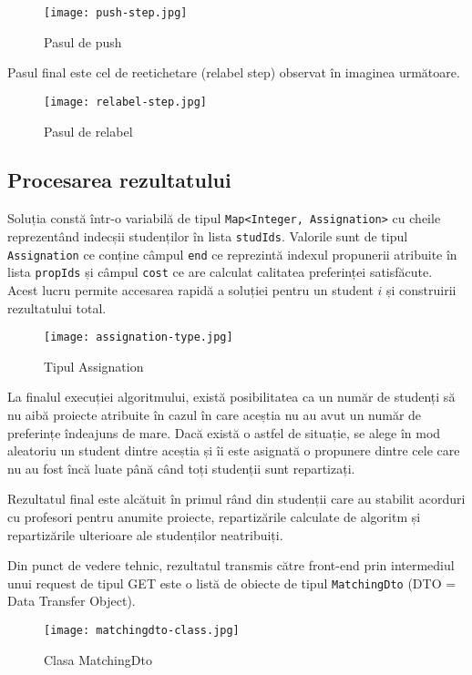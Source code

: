 \begin{figure}[H]
	\centering
	\texttt{[image: push-step.jpg]}
	\caption{Pasul de push}
\end{figure}

Pasul final este cel de reetichetare (relabel step) observat în imaginea următoare.

\begin{figure}[H]
	\centering
	\texttt{[image: relabel-step.jpg]}
	\caption{Pasul de relabel}
\end{figure}

\subsection{Procesarea rezultatului}

Soluția constă într-o variabilă de tipul \texttt{Map<Integer, Assignation>} cu cheile reprezentând indecșii studenților în lista \texttt{studIds}. Valorile sunt de tipul \texttt{Assignation} ce conține câmpul \texttt{end} ce reprezintă indexul propunerii atribuite în lista \texttt{propIds} și câmpul \texttt{cost} ce are calculat calitatea preferinței satisfăcute. Acest lucru permite accesarea rapidă a soluției pentru un student $i$ și construirii rezultatului total.

\begin{figure}[H]
	\centering
	\texttt{[image: assignation-type.jpg]}
	\caption{Tipul Assignation}
\end{figure}

La finalul execuției algoritmului, există posibilitatea ca un număr de studenți să nu aibă proiecte atribuite în cazul în care aceștia nu au avut un număr de preferințe îndeajuns de mare. Dacă există o astfel de situație, se alege în mod aleatoriu un student dintre aceștia și îi este asignată o propunere dintre cele care nu au fost încă luate până când toți studenții sunt repartizați.

Rezultatul final este alcătuit în primul rând din studenții care au stabilit acorduri cu profesori pentru anumite proiecte, repartizările calculate de algoritm și repartizările ulterioare ale studenților neatribuiți.

Din punct de vedere tehnic, rezultatul transmis către front-end prin intermediul unui request de tipul GET este o listă de obiecte de tipul \texttt{MatchingDto} (DTO = Data Transfer Object).

\begin{figure}[H]
	\centering
	\texttt{[image: matchingdto-class.jpg]}
	\caption{Clasa MatchingDto}
\end{figure}

